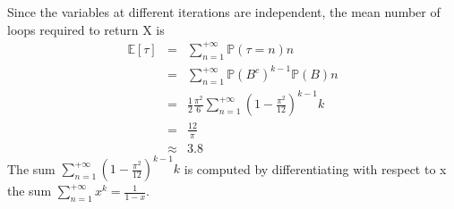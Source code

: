 Since the variables at different iterations are independent, the mean number of loops required to return X is 
\begin{eqnarray*}
	\mathbb{E}[\tau]&=&\sum_{n=1}^{+\infty}\mathbb{P}(\tau=n)n\\
	&=&\sum_{n=1}^{+\infty}\mathbb{P}(B^{c})^{k-1}\mathbb{P}(B)n\\
	&=&\frac{1}{2}\frac{\pi^{2}}{6}\sum_{n=1}^{+\infty}(1-\frac{\pi^{2}}{12})^{k-1}k\\
	&=&\frac{12}{\pi}\\
	&\approx& 3.8
\end{eqnarray*}
The sum $\sum_{n=1}^{+\infty}(1-\frac{\pi^{2}}{12})^{k-1}k$ is computed by differentiating with respect to x the sum $\sum_{n=1}^{+\infty}x^{k}=\frac{1}{1-x}$.



